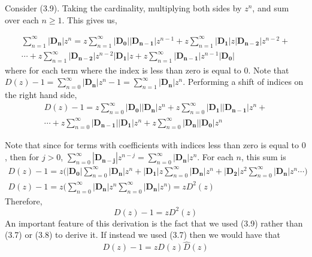 \documentclass[12pt]{article}
\theoremstyle{definition}
\numberwithin{equation}{section}
\begin{document}
Consider (3.9). Taking the cardinality, multiplying both sides by $z^n$, and sum over each $n\geq 1$. This gives us,

\begin{multline}
    \sum_{n=1}^\infty |\mathbf{D_n}|z^n = z\sum_{n=1}^\infty |\mathbf{D_0}||\mathbf{D_{n-1}}|z^{n-1} + z\sum_{n=1}^\infty |\mathbf{D_1}|z|\mathbf{D_{n-2}}|z^{n-2} + \\
    \cdots + z\sum_{n=1}^\infty |\mathbf{D_{n-2}}|z^{n-2}|\mathbf{D_1}|z + z\sum_{n=1}^\infty |\mathbf{D_{n-1}}|z^{n-1}|\mathbf{D_0}|\hspace{40pt}
\end{multline}
where for each term where the index is less than zero is equal to $0$. Note that \newline
$D(z) - 1 = \sum_{n=0}^\infty |\mathbf{D_n}|z^n - 1 = \sum_{n=1}^\infty |\mathbf{D_n}|z^n$. Performing a shift of indices on the right hand side,
\begin{multline}
    D(z) - 1 = z\sum_{n=0}^\infty |\mathbf{D_0}||\mathbf{D_{n}}|z^n + z\sum_{n=0}^\infty |\mathbf{D_1}||\mathbf{D_{n-1}}|z^{n} + \\ 
    \cdots + z\sum_{n=0}^\infty |\mathbf{D_{n-1}}||\mathbf{D_1}|z^{n} + z\sum_{n=0}^\infty |\mathbf{D_n}||\mathbf{D_0}|z^n\hspace{50pt}
\end{multline}

\iffalse
\begin{equation}
     D(z) - 1 = z\Big( |\mathbf{D_0}|\sum_{n=0}^\infty |\mathbf{D_n}|z^n + |\mathbf{D_1}|z\sum_{n = 0}^\infty |\mathbf{D_{n-1}}|z^{n-1} + |\mathbf{D_2}|z^2\sum_{n=0}^\infty |\mathbf{D_{n-2}}|z^{n-2}  + \cdots \Big) |\mathbf{D_{n-1}}|z^{n-1}\sum_{n=0}^\infty |\mathbf{D_{1}}|z + |\mathbf{D_{n}}|z^n\sum_{n=0}^\infty |\mathbf{D_0}| \Big)\hspace{30pt}
\end{equation}
\fi

Note that since for terms with coefficients with indices less than zero is equal to $0$, then for $j>0$, $\sum_{n=0}^\infty|\mathbf{D_{n-j}}|z^{n-j} = \sum_{n=0}^\infty |\mathbf{D_n}|z^n$. For each $n$, this sum is
\begin{equation}
\begin{split}
   D(z) - 1 = z\Big(|\mathbf{D_0}|\sum_{n=0}^\infty |\mathbf{D_n}|z^n + |\mathbf{D_1}|z\sum_{n = 0}^\infty |\mathbf{D_{n}}|z^{n} + |\mathbf{D_2}|z^2\sum_{n=0}^\infty |\mathbf{D_n}|z^n \cdots     \Big) \\ 
    D(z) - 1= z\Big( \sum_{n=0}^\infty |\mathbf{D_n}|z^n \sum_{n=0}^\infty |\mathbf{D_n}|z^n \Big) =zD^2(z)\hspace{50pt}
    \end{split}
\end{equation}
Therefore,
\begin{equation}
    D(z) - 1 = zD^2(z)
\end{equation}
An important feature of this derivation is the fact that we used (3.9) rather than (3.7) or (3.8) to derive it. If instead we used (3.7) then we would have that
\begin{equation}
    D(z) - 1 = zD(z)\hat{D}(z)
\end{equation}
\end{document}
